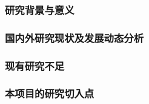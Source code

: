 \justifying
\NSFCBodyText

\subsubsection{研究背景与意义}

\subsubsection{国内外研究现状及发展动态分析}

\subsubsection{现有研究不足}

\subsubsection{本项目的研究切入点}

